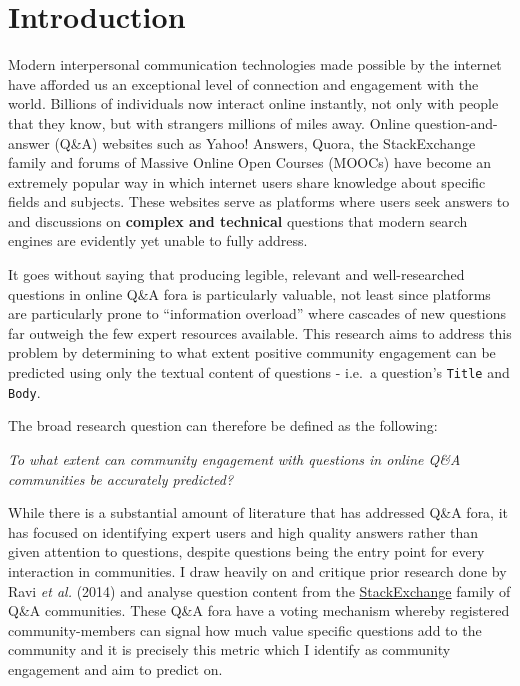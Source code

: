 \documentclass[11pt,preprint, authoryear]{article}
\numberwithin{equation}{section}
\begin{document}
\clearpage


\newpage

\section{\texorpdfstring{Introduction
\label{Intro}}{Introduction }}\label{introduction}

Modern interpersonal communication technologies made possible by the
internet have afforded us an exceptional level of connection and
engagement with the world. Billions of individuals now interact online
instantly, not only with people that they know, but with strangers
millions of miles away. Online question-and-answer (Q\&A) websites such
as Yahoo! Answers, Quora, the StackExchange family and forums of Massive
Online Open Courses (MOOCs) have become an extremely popular way in
which internet users share knowledge about specific fields and subjects.
These websites serve as platforms where users seek answers to and
discussions on \textbf{complex and technical} questions that modern
search engines are evidently yet unable to fully address.

It goes without saying that producing legible, relevant and
well-researched questions in online Q\&A fora is particularly valuable,
not least since platforms are particularly prone to ``information
overload'' where cascades of new questions far outweigh the few expert
resources available. This research aims to address this problem by
determining to what extent positive community engagement can be
predicted using only the textual content of questions - i.e.~a
question's \texttt{Title} and \texttt{Body}.

The broad research question can therefore be defined as the following:

\begin{center}
\emph{To what extent can community engagement with questions in online Q\&A communities be accurately predicted?}
\end{center}

While there is a substantial amount of literature that has addressed
Q\&A fora, it has focused on identifying expert users and high quality
answers rather than given attention to questions, despite questions
being the entry point for every interaction in communities. I draw
heavily on and critique prior research done by Ravi \emph{et al.} (2014)
and analyse question content from the
\href{https://stackexchange.com/sites\#}{StackExchange} family of Q\&A
communities. These Q\&A fora have a voting mechanism whereby registered
community-members can signal how much value specific questions add to
the community and it is precisely this metric which I identify as
community engagement and aim to predict on.
\end{document}

